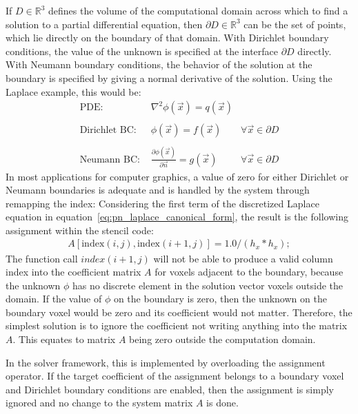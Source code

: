 If $D\in\mathbb{R}^3$ defines the volume of the computational domain across which to find a solution to a partial differential equation, then $\partial D\in\mathbb{R}^3$ can be the set of points, which lie directly on the boundary of that domain. With Dirichlet boundary conditions, the value of the unknown is specified at the interface $\partial D$ directly. With Neumann boundary conditions, the behavior of the solution at the boundary is specified by giving a normal derivative of the solution. Using the Laplace example, this would be:
\begin{align*}
\text{PDE:\ \ } & \nabla^2\phi\left(\vec{x}\right) = q\left(\vec{x}\right)
&
\\
\\
\text{Dirichlet BC:\ \ } & \phi\left(\vec{x}\right) = f\left(\vec{x}\right)
&\forall \vec{x}\in\partial D
\\
\\
\text{Neumann BC:\ \ } & \frac{\partial\phi\left(\vec{x}\right)}{\partial\vec{n}} = g\left(\vec{x}\right)
&\forall \vec{x}\in\partial D
\end{align*}
In most applications for computer graphics, a value of zero for either Dirichlet or Neumann boundaries is adequate and is handled by the system through remapping the index: Considering the first term of the discretized Laplace equation in equation~\ref{eq:pn_laplace_canonical_form}, the result is the following assignment within the stencil code:
\begin{align}
A[\mathrm{index}(i,j), \mathrm{index}(i+1, j)] = 1.0/(h_x*h_x);
\end{align}
The function call $index(i+1, j)$ will not be able to produce a valid column index into the coefficient matrix $A$ for voxels adjacent to the boundary, because the unknown $\phi$ has no discrete element in the solution vector voxels outside the domain. If the value of $\phi$ on the boundary is zero, then the unknown on the boundary voxel would be zero and its coefficient would not matter. Therefore, the simplest solution is to ignore the coefficient not writing anything into the matrix $A$. This equates to matrix $A$ being zero outside the computation domain.

In the solver framework, this is implemented by overloading the assignment operator. If the target coefficient of the assignment belongs to a boundary voxel and Dirichlet boundary conditions are enabled, then the assignment is simply ignored and no change to the system matrix $A$ is done.

